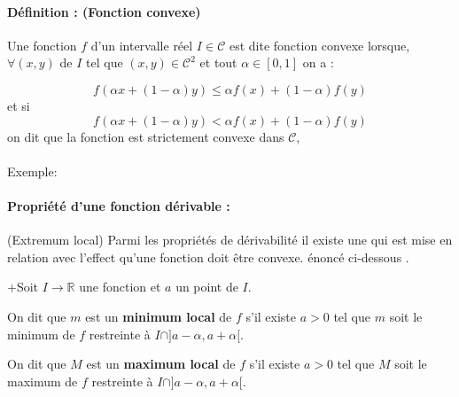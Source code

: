 		\paragraph*{Définition : (Fonction convexe)}
		Une fonction $f$ d'un intervalle réel $I \in \mathcal{C}$ est dite fonction convexe lorsque, $\forall (x,y)$ de $I$ tel que $(x,y) \in \mathcal{C}^2$ et tout $\alpha \in [0, 1]$  on a :
		
				
		\begin{equation}
			f(\alpha x + (1 - \alpha)y) \leq \alpha f(x) + (1 - \alpha)f(y)
			\label{eq_convexe-1}
		\end{equation}
		et si
		\begin{equation}
			f(\alpha x + (1 - \alpha)y) < \alpha f(x) + (1 - \alpha)f(y)
			\label{eq_convexe-2}
		\end{equation}
		on dit que la fonction est strictement convexe dans $\mathcal{C}$,  \cite{jtshiman:2021}\\\\
		Exemple: 
	
		\paragraph*{Propriété d'une fonction dérivable : } (Extremum local) 
		Parmi les propriétés de dérivabilité il existe une qui est mise en relation avec l'effect qu'une fonction doit être convexe. énoncé ci-dessous \cite[][p. 212]{coulombeau2013math}.\\
		\begin{list}{+}{Soit $I \rightarrow  \mathbb{R} $ une fonction et $a$ un point de $I$.}
			\item  {On dit que $m$ est un \textbf{minimum local} de $f$ s'il existe $a > 0$ tel que $m$ soit le minimum de $f$ restreinte à $I \cap ] a-\alpha, a + \alpha [$. }
			\item On dit que $M$ est un \textbf{maximum local} de $f$ s'il existe $a > 0$ tel que $M$ soit le maximum de $f$ restreinte à $I \cap ] a-\alpha, a + \alpha [$. 
		\end{list} 
		
